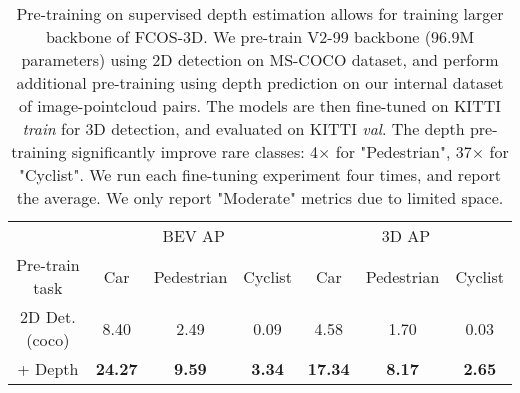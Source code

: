 
\begin{table}[t!]
\centering
{
\footnotesize
\setlength{\tabcolsep}{0.4em}
\begin{tabular}{c|ccc|ccc}
\toprule
& \multicolumn{3}{c}{BEV AP} & \multicolumn{3}{c}{3D AP} \\ 
\multirow{-2}{*}{Pre-train task}& 
Car & 
Pedestrian &
Cyclist &
Car & Pedestrian & Cyclist \vspace{0.5mm}\\
\midrule
2D Det. (coco)  & 
8.40 & 
2.49 &
0.09 &
4.58 &
1.70 &
0.03
\\
  + Depth & 
\textbf{24.27} & 
\textbf{9.59} &
\textbf{3.34} &
\textbf{17.34} &
\textbf{8.17} &
\textbf{2.65}
\\
\bottomrule
\end{tabular}\\\vspace{0mm}
\caption{Pre-training on supervised depth estimation allows for training larger backbone of FCOS-3D. We pre-train V2-99 \cite{lee2019centermask} backbone (96.9M parameters) using 2D detection on MS-COCO dataset, and perform additional pre-training using depth prediction on our internal dataset of image-pointcloud pairs. The models are then fine-tuned on KITTI \emph{train} for 3D detection, and evaluated on KITTI \emph{val}. The depth pre-training significantly improve rare classes: 4$\times$ for "Pedestrian", 37$\times$ for "Cyclist". We run each fine-tuning experiment four times, and report the average. We only report "Moderate" metrics due to limited space.}
\label{table:v2-99}
}
\end{table}
